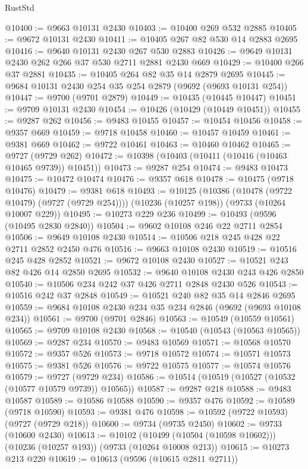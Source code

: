 \begin{lexlean}{RustStd}
\begin{coremodule}
{\begin{coremodule}
{{{{{{{{{{{{{{{{{{{{{{{{{{{{{{{{{{{{{{{{{{{{{{{{{{{{{{{@10400 := @9663 @10131 @2430
@10403 := @10400 @269 @532 @2885
@10405 := @9672 @10131 @2430
@10411 := @10405 @267 @82 @530 @14 @2883 @2695
@10416 := @9640 @10131 @2430 @267 @530 @2883
@10426 := @9649 @10131 @2430 @262 @266 @37 @530 @2711 @2881 @2430 @669
@10429 := @10400 @266 @37 @2881
@10435 := @10405 @264 @82 @35 @14 @2879 @2695
@10445 := @9684 @10131 @2430 @254 @35 @254 @2879 (@9692 (@9693 @10131 @254))
@10447 := @9700 (@9701 @2879)
@10449 := @10435 (@10445 @10447)
@10451 := @9709 @10131 @2430
@10454 := @10426 (@10429 (@10449 @10451))
@10455 := @9287 @262
@10456 := @9483 @10455
@10457 := @10454 @10456
@10458 := @9357 @669
@10459 := @9718 @10458
@10460 := @10457 @10459
@10461 := @9381 @669
@10462 := @9722 @10461
@10463 := @10460 @10462
@10465 := @9727 (@9729 @262)
@10472 := @10398 (@10403 (@10411 (@10416 (@10463 @10465 @9739)) @10451))
@10473 := @9287 @254
@10474 := @9483 @10473
@10475 := @10472 @10474
@10476 := @9357 @618
@10478 := @10475 (@9718 @10476)
@10479 := @9381 @618
@10493 := @10125
    (@10386 (@10478 (@9722 @10479) (@9727 (@9729 @254))))
    (@10236 (@10257 @198))
    (@9733 (@10264 @10007 @229))
@10495 := @10273 @229 @236
@10499 := @10493 (@9596 (@10495 @2830 @2840))
@10504 := @9602 @10108 @246 @22 @2711 @2854
@10506 := @9649 @10108 @2430
@10514 := @10506 @218 @245 @428 @22 @2711 @2852 @2450 @476
@10516 := @9663 @10108 @2430
@10519 := @10516 @245 @428 @2852
@10521 := @9672 @10108 @2430
@10527 := @10521 @243 @82 @426 @14 @2850 @2695
@10532 := @9640 @10108 @2430 @243 @426 @2850
@10540 := @10506 @234 @242 @37 @426 @2711 @2848 @2430 @526
@10543 := @10516 @242 @37 @2848
@10549 := @10521 @240 @82 @35 @14 @2846 @2695
@10559 := @9684 @10108 @2430 @234 @35 @234 @2846 (@9692 (@9693 @10108 @234))
@10561 := @9700 (@9701 @2846)
@10563 := @10549 (@10559 @10561)
@10565 := @9709 @10108 @2430
@10568 := @10540 (@10543 (@10563 @10565))
@10569 := @9287 @234
@10570 := @9483 @10569
@10571 := @10568 @10570
@10572 := @9357 @526
@10573 := @9718 @10572
@10574 := @10571 @10573
@10575 := @9381 @526
@10576 := @9722 @10575
@10577 := @10574 @10576
@10579 := @9727 (@9729 @234)
@10586 := @10514 (@10519 (@10527 (@10532 (@10577 @10579 @9739)) @10565))
@10587 := @9287 @218
@10588 := @9483 @10587
@10589 := @10586 @10588
@10590 := @9357 @476
@10592 := @10589 (@9718 @10590)
@10593 := @9381 @476
@10598 := @10592 (@9722 @10593) (@9727 (@9729 @218))
@10600 := @9734 (@9735 @2450)
@10602 := @9733 (@10600 @2430)
@10613 := @10102
    (@10499 (@10504 (@10598 @10602)))
    (@10236 (@10257 @193))
    (@9733 (@10264 @10008 @213))
@10615 := @10273 @213 @220
@10619 := @10613 (@9596 (@10615 @2811 @2711))
}}}}}}}}}}}}}}}}}}}}}}}}}}}}}}}}}}}}}}}}}}}}}}}}}}}}}}}
\end{coremodule}}
\end{coremodule}
\end{lexlean}
